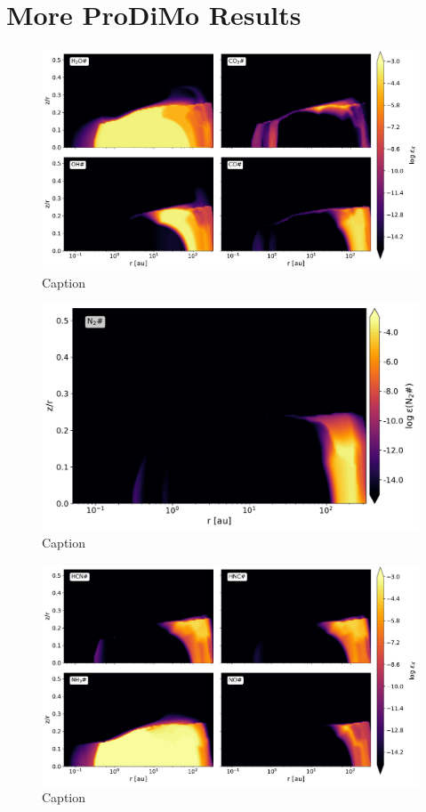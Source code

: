 \documentclass[oneside, single, authoryear, semicolon, 12pt]{lion-msc}
\newcommand{\4}{$_4$}
\newcommand{\3}{$_3$}
\newcommand{\2}{$_2$}
\begin{document}
\chapter{More ProDiMo Results}
\begin{figure}
    \centering
    \includegraphics[width=\linewidth]{Figures/Abundance1ice.pdf}
    \caption{Caption}
    \label{fig:enter-label}
\end{figure}
\begin{figure}
    \centering
    \includegraphics[width=\linewidth]{Figures/AbundanceN2ice.pdf}
    \caption{Caption}
    \label{fig:enter-label}
\end{figure}
\begin{figure}
    \centering
    \includegraphics[width=\linewidth]{Figures/Abundance2ice.pdf}
    \caption{Caption}
    \label{fig:enter-label}
\end{figure}
\end{document}
